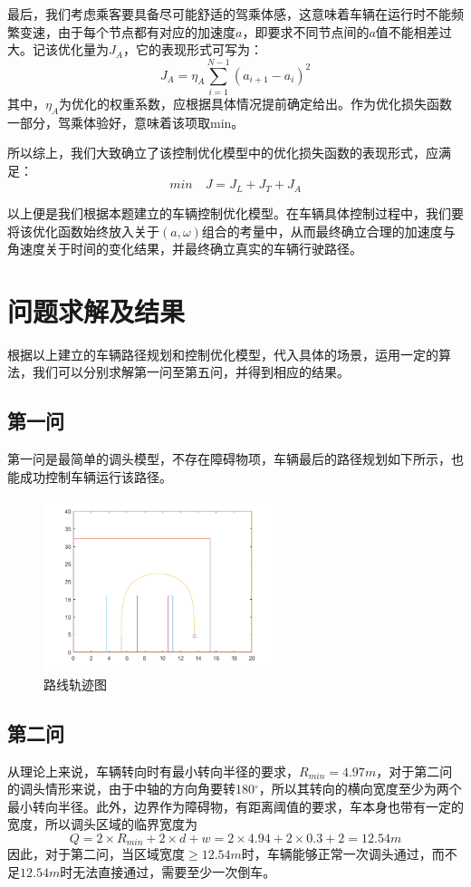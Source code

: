 \documentclass{article}
\begin{document}
	最后，我们考虑乘客要具备尽可能舒适的驾乘体感，这意味着车辆在运行时不能频繁变速，由于每个节点都有对应的加速度$a$，即要求不同节点间的$a$值不能相差过大。记该优化量为$J_{A}$，它的表现形式可写为：
    \begin{equation}
	J_{A}=\eta_{A}\sum_{i=1}^{N-1}(a_{i+1}-a_{i})^2
	\end{equation}
	其中，$\eta_{A}$为优化的权重系数，应根据具体情况提前确定给出。作为优化损失函数一部分，驾乘体验好，意味着该项取min。

	所以综上，我们大致确立了该控制优化模型中的优化损失函数的表现形式，应满足：
    \begin{equation}
		min\quad J=J_{L}+J_{T}+J_{A}
	\end{equation}

	以上便是我们根据本题建立的车辆控制优化模型。在车辆具体控制过程中，我们要将该优化函数始终放入关于$(a,\omega)$组合的考量中，从而最终确立合理的加速度与角速度关于时间的变化结果，并最终确立真实的车辆行驶路径。
	
	\newpage
	\section{问题求解及结果}
	根据以上建立的车辆路径规划和控制优化模型，代入具体的场景，运用一定的算法，我们可以分别求解第一问至第五问，并得到相应的结果。
	\subsection{第一问}
	第一问是最简单的调头模型，不存在障碍物项，车辆最后的路径规划如下所示，也能成功控制车辆运行该路径。
	\begin{figure}[!h]
		\centering 
		\includegraphics[width=0.6\textwidth]{problem1.png}	
		\caption{路线轨迹图}
	\end{figure}
	\subsection{第二问}
	从理论上来说，车辆转向时有最小转向半径的要求，$R_{min}=4.97m$，对于第二问的调头情形来说，由于中轴的方向角要转180$^\circ$，所以其转向的横向宽度至少为两个最小转向半径。此外，边界作为障碍物，有距离阈值的要求，车本身也带有一定的宽度，所以调头区域的临界宽度为
	\begin{equation}
		Q=2\times R_{min}+2\times d+w=2\times 4.94+2\times 0.3+2=12.54m
	\end{equation}
	因此，对于第二问，当区域宽度$\geq12.54m$时，车辆能够正常一次调头通过，而不足$12.54m$时无法直接通过，需要至少一次倒车。
	
\end{document}
